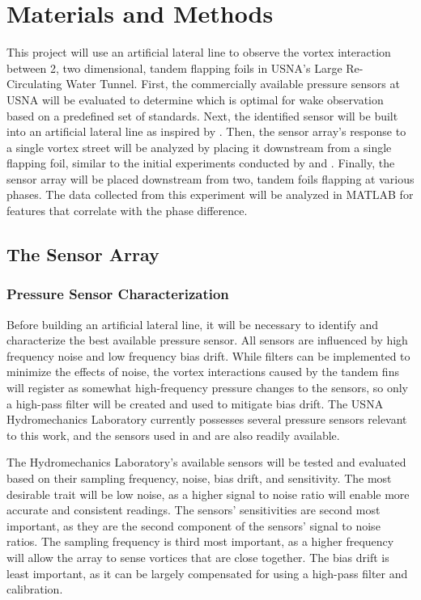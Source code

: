 \section{Materials and Methods}

    This project will use an artificial lateral line to observe the vortex interaction between 2, two dimensional, tandem flapping foils in USNA's Large Re-Circulating Water Tunnel. First, the commercially available pressure sensors at USNA will be evaluated to determine which is optimal for wake observation based on a predefined set of standards. Next, the identified sensor will be built into an artificial lateral line as inspired by \citep{Venturelli2012}. Then, the sensor array's response to a single vortex street will be analyzed by placing it downstream from a single flapping foil, similar to the initial experiments conducted by \citep{Venturelli2012} and \citep{Boschitsch2014}. Finally, the sensor array will be placed downstream from two, tandem foils flapping at various phases. The data collected from this experiment will be analyzed in MATLAB for features that correlate with the phase difference.

\subsection{The Sensor Array} \label{The Sensor Array}
\subsubsection{Pressure Sensor Characterization} \label{Pressure Sensor Characterization}
     
    Before building an artificial lateral line, it will be necessary to identify and characterize the best available pressure sensor. All sensors are influenced by high frequency noise and low frequency bias drift. While filters can be implemented to minimize the effects of noise, the vortex interactions caused by the tandem fins will register as somewhat high-frequency pressure changes to the sensors, so only a high-pass filter will be created and used to mitigate bias drift. The USNA Hydromechanics Laboratory currently possesses several pressure sensors relevant to this work, and the sensors used in \citep{Venturelli2012} and \citep{Chambers2014} are also readily available.
    
    The Hydromechanics Laboratory's available sensors will be tested and evaluated based on their sampling frequency, noise, bias drift, and sensitivity. The most desirable trait will be low noise, as a higher signal to noise ratio will enable more accurate and consistent readings. The sensors' sensitivities are second most important, as they are the second component of the sensors' signal to noise ratios. The sampling frequency is third most important, as a higher frequency will allow the array to sense vortices that are close together. The bias drift is least important, as it can be largely compensated for using a high-pass filter and calibration.
    
